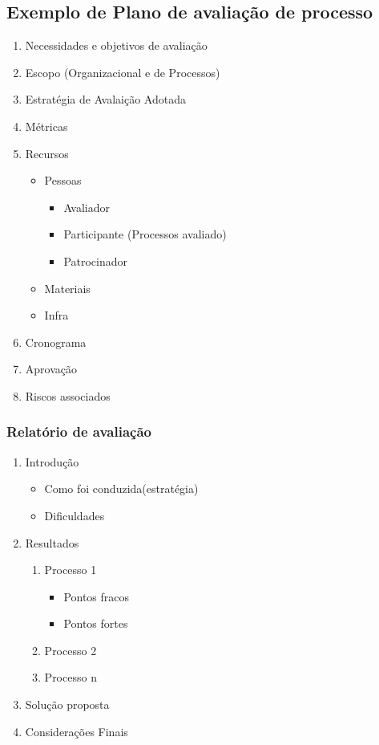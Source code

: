 \documentclass{article}
\begin{document}
\subsection{Exemplo de Plano de avaliação de processo}
	\begin{enumerate}
	\item Necessidades e objetivos de avaliação
	\item Escopo (Organizacional e de Processos)
	\item Estratégia de Avalaição Adotada
	\item Métricas
	\item Recursos
		\begin{itemize}
		\item Pessoas
			\begin{itemize}
			\item Avaliador
			\item Participante (Processos avaliado)
			\item Patrocinador
			\end{itemize}
		\item Materiais
		\item Infra
		\end{itemize}
	\item Cronograma
	\item Aprovação
	\item Riscos associados
	\end{enumerate}

\subsubsection{Relatório de avaliação}

	\begin{enumerate}
	\item Introdução
		\begin{itemize}
		\item Como foi conduzida(estratégia)
		\item Dificuldades
		\end{itemize}
	\item Resultados
		\begin{enumerate}
		\item Processo 1
			\begin{itemize}
			\item Pontos fracos
			\item Pontos fortes
			\end{itemize}
		\item Processo 2
		\item Processo n
		\end{enumerate}
	\item Solução proposta
	\item Considerações Finais
	\end{enumerate}
\end{document}
